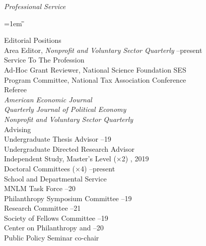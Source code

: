 \documentclass[12pt]{article}
\newcommand{\libertineSB}[1]{\textit{#1}}
\newlength{\midlength}
\newlength{\firstlength}
\newlength{\listindent}
\newlength{\dategap}
\newlength{\wrapgap}
\newcommand{\heading}[1]{
	{\setlength{\parskip}{0.8cm plus6mm minus3mm}
	\parindent=0pt
	\large \libertineSB{{#1}}}
	\vspace{0.1em}
}
\newenvironment{datetabbing}{
	\begin{tabbing}
	\parskip=1em
	\hspace*{\listindent}\=\hspace*{\firstlength}\=\hspace*{\midlength}\= \kill
}{
	\end{tabbing}
}
\begin{document}
\clearpage
\heading{Professional Service}

\begin{datetabbing}	
\>  Editorial Positions																\\[\wrapgap]
\>	\>	Area Editor, \textit{Nonprofit and Voluntary Sector Quarterly}
															--present	\'	\\[\dategap]
\>  Service To The Profession														\\[\wrapgap]
\>	\>	Ad-Hoc Grant Reviewer, National Science Foundation SES				\'	\\[\wrapgap]
\>	\>	Program Committee, National Tax Association Conference 				\'	\\[\dategap]
\>	Referee																			\\[\wrapgap]
\>	\>	\textit{American Economic Journal}											\\[\wrapgap]
\>	\>	\textit{Quarterly Journal of Political Economy}								\\[\wrapgap]
\>	\>	\textit{Nonprofit and Voluntary Sector Quarterly}							\\[\dategap]
\>	Advising																		\\[\wrapgap]
\>	\>	Undergraduate Thesis Advisor 						--19	\'	\\[\wrapgap]
\>	\>	Undergraduate Directed Research Advisor						\'	\\[\wrapgap]
\>	\>	Independent Study, Master's Level ($\times$2)		, 2019	\'	\\[\wrapgap]
\>	\>	Doctoral Committees	 ($\times$4)						--present	\'	\\[\dategap]
\>	School and Departmental Service													\\[\wrapgap]
\>	\>	MNLM Task Force										--20	\'	\\[\wrapgap]
\>	\>	Philanthropy Symposium Committee						--19	\'	\\[\wrapgap]
\>	\>	Research Committee									--21	\'	\\[\wrapgap]
\>	\>	Society of Fellows Committee							--19	\'	\\[\wrapgap]
\>	\>	Center on Philanthropy and							--20	\'	\\[\wrapgap]
\>	\>  \hspace{1em}Public Policy Seminar co-chair			\>					\'	\\[\wrapgap]

\end{datetabbing}
\end{document}
